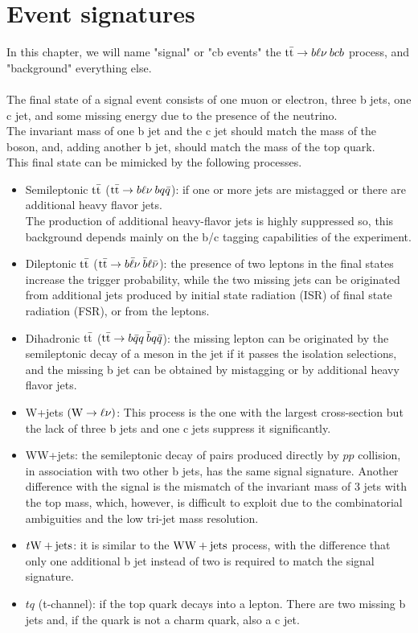 \label{sec:Events}
\vspace{-1cm}
\minitoc


\section{Event signatures}
In this chapter, we will name "signal" or "cb events" the ${{\text{t}}{\bar{\text{t}}}} \to b\ell\nu\: bcb$ process, and "background" everything else.\\
\\
The final state of a signal event consists of one muon or electron, three b jets, one c jet, and some missing energy due to the presence of the neutrino.\\
The invariant mass of one b jet and the c jet should match the mass of the \PW boson, and, adding another b jet, should match the mass of the top quark.\\
This final state can be mimicked by the following processes.
\begin{itemize}
    \item Semileptonic ${{\text{t}}{\bar{\text{t}}}}$ (${{\text{t}}{\bar{\text{t}}}}\to b\ell\nu \: bq\bar{q}$): if one or more jets are mistagged or there are additional heavy flavor jets.\\
    The production of additional heavy-flavor jets is highly suppressed so, this background depends mainly on the b/c tagging capabilities of the experiment.
    \item Dileptonic ${{\text{t}}{\bar{\text{t}}}}$ (${{\text{t}}{\bar{\text{t}}}} \to b\bar{\ell}\nu \: \bar{b}\ell\bar{\nu}$): the presence of two leptons in the final states increase the trigger probability, while the two missing jets can be originated from additional jets produced by initial state radiation (ISR) of final state radiation (FSR), or from the leptons.
    \item Dihadronic ${{\text{t}}{\bar{\text{t}}}}$ (${{\text{t}}{\bar{\text{t}}}} \to b\bar{q}q \: \bar{b}q\bar{q}$): the missing lepton can be originated by the semileptonic decay of a meson in the jet if it passes the isolation selections, and the missing b jet can be obtained by mistagging or by additional heavy flavor jets.
    \item W+jets $({\text{W}} \to \ell \nu)$: This process is the one with the largest cross-section but the lack of three b jets and one c jets suppress it significantly.
    \item WW+jets: the semileptonic decay of \PW pairs produced directly by $pp$ collision, in association with two other b jets, has the same signal signature. Another difference with the signal is the mismatch of the invariant mass of 3 jets with the top mass, which, however, is difficult to exploit due to the combinatorial ambiguities and the low tri-jet mass resolution.  
    \item $t{\text{W}}+\text{jets}$: it is similar to the ${\text{W}} {\text{W}} + \text{jets}$ process, with the difference that only one additional b jet instead of two is required to match the signal signature.
    \item $tq$ (t-channel): if the top quark decays into a lepton. There are two missing b jets and, if the quark is not a charm quark, also a c jet.
\end{itemize}
